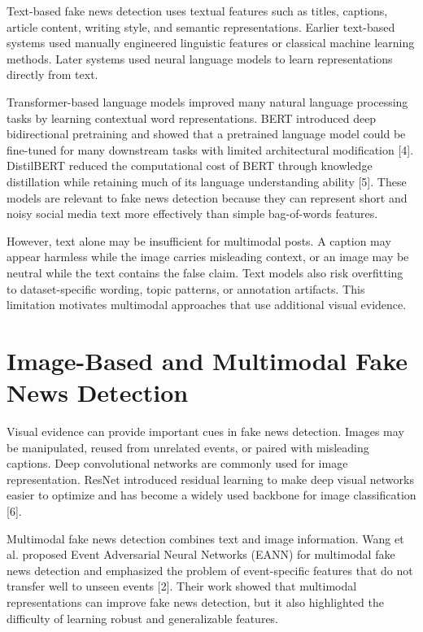 Text-based fake news detection uses textual features such as titles, captions, article content, writing style, and semantic representations. Earlier text-based systems used manually engineered linguistic features or classical machine learning methods. Later systems used neural language models to learn representations directly from text.


Transformer-based language models improved many natural language processing tasks by learning contextual word representations. BERT introduced deep bidirectional pretraining and showed that a pretrained language model could be fine-tuned for many downstream tasks with limited architectural modification [4]. DistilBERT reduced the computational cost of BERT through knowledge distillation while retaining much of its language understanding ability [5]. These models are relevant to fake news detection because they can represent short and noisy social media text more effectively than simple bag-of-words features.


However, text alone may be insufficient for multimodal posts. A caption may appear harmless while the image carries misleading context, or an image may be neutral while the text contains the false claim. Text models also risk overfitting to dataset-specific wording, topic patterns, or annotation artifacts. This limitation motivates multimodal approaches that use additional visual evidence.


\section{Image-Based and Multimodal Fake News Detection}


Visual evidence can provide important cues in fake news detection. Images may be manipulated, reused from unrelated events, or paired with misleading captions. Deep convolutional networks are commonly used for image representation. ResNet introduced residual learning to make deep visual networks easier to optimize and has become a widely used backbone for image classification [6].


Multimodal fake news detection combines text and image information. Wang et al. proposed Event Adversarial Neural Networks (EANN) for multimodal fake news detection and emphasized the problem of event-specific features that do not transfer well to unseen events [2]. Their work showed that multimodal representations can improve fake news detection, but it also highlighted the difficulty of learning robust and generalizable features.


